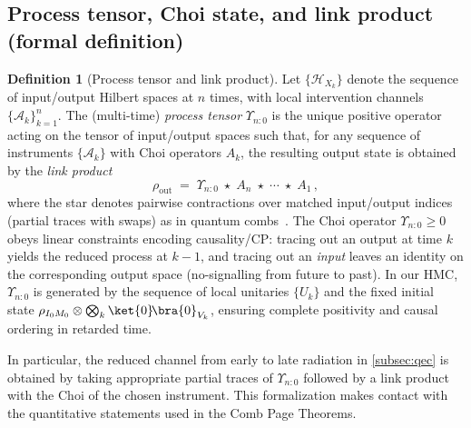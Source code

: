 \documentclass[11pt,a4paper]{article}
\newcommand{\HMC}{\textsc{HMC}\xspace}
\theoremstyle{plain}
\theoremstyle{definition}
\newtheorem{definition}[theorem]{Definition}
\theoremstyle{remark}
\begin{document}
\subsection{Process tensor, Choi state, and link product (formal definition)}
\label{subsec:process-tensor-def}
\begin{definition}[Process tensor and link product]
Let $\{\mathcal{H}_{X_k}\}$ denote the sequence of input/output Hilbert spaces at $n$ times, with local intervention channels $\{\mathcal{A}_k\}_{k=1}^n$. The (multi-time) \emph{process tensor} $\Upsilon_{n{:}0}$ is the unique positive operator acting on the tensor of input/output spaces such that, for any sequence of instruments $\{\mathcal{A}_k\}$ with Choi operators $A_k$, the resulting output state is obtained by the \emph{link product}
\begin{equation}
\rho_{\mathrm{out}} \;=\; \Upsilon_{n{:}0} \;\star\; A_n \;\star\; \cdots \;\star\; A_1 \,,
\end{equation}
where the star denotes pairwise contractions over matched input/output indices (partial traces with swaps) as in quantum combs~\cite{Chiribella:2009}. The Choi operator $\Upsilon_{n{:}0}\ge 0$ obeys linear constraints encoding causality/CP: tracing out an output at time $k$ yields the reduced process at $k{-}1$, and tracing out an \emph{input} leaves an identity on the corresponding output space (no-signalling from future to past). In our \HMC{}, $\Upsilon_{n{:}0}$ is generated by the sequence of local unitaries $\{U_k\}$ and the fixed initial state $\rho_{I_0M_0}\otimes\bigotimes_k \ket{0}\!\bra{0}_{V_k}$, ensuring complete positivity and causal ordering in retarded time.
\end{definition}
In particular, the reduced channel from early to late radiation in \cref{subsec:qec} is obtained by taking appropriate partial traces of $\Upsilon_{n{:}0}$ followed by a link product with the Choi of the chosen instrument. This formalization makes contact with the quantitative statements used in the Comb Page Theorems.
\end{document}
